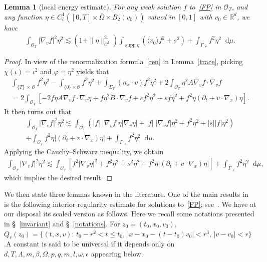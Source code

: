 \documentclass[10pt]{amsart}
\newtheorem{lemm}[theo]{Lemma}\newtheorem{prop}[theo]{Proposition}\newtheorem{coro}[theo]{Corollary}\newtheorem{conj}[theo]{Conjecture}
\theoremstyle{definition}\newtheorem{defi}[theo]{Definition}\newtheorem{rema}[theo]{Remark}\newtheorem{exam}[theo]{Example}\newtheorem{exem}[theo]{Example}\newtheorem{nota}[theo]{Notation}
\newcommand*{\dif}{\mathop{}\!\mathrm{d}}
\DeclareMathOperator{\supp}{supp}
\newcommand*\p{\partial}
\newcommand*\R {\mathbb{R}}
\newcommand*\Ge {\Gamma_{\;\!\!\;\!\!e}}
\newcommand*\OO {\mathcal{O}}
\newcommand{\lvv}{\langle v_0\rangle}
\begin{document}
\begin{lemm}[local energy estimate]\label{energy}
For any weak solution $f$ to~\eqref{FP} in $\OO_T$, and any function $\eta\in C_c^1([0,T]\times\overline{\Omega}\times B_2(v_0))$ valued in $[0,1]$ with $v_0\in\R^d$, we have
\begin{align*}
\int_{\OO_T}\left|\nabla_vf\right|^2\eta^2
\lesssim\left(1+\|\eta\|_{C^1}^2\right)\int_{\supp\eta}\left(\lvv f^2 +s^2\right) +\int_{\Ge} f^2\eta^2 \dif\mu.
\end{align*}
\end{lemm}
\begin{proof}
In view of the renormalization formula~\eqref{ren} in Lemma~\ref{trace}, picking $\chi(\iota)=\iota^2$ and $\varphi=\eta^2$ yields that
\begin{multline*}
\int_{\{T\}\,\times\,\OO}f^2\eta^2-\int_{\{0\}\times\OO}f^2\eta^2 +\int_{\Sigma_T} (n_x\cdot v) f^2\eta^2 +2\int_{\OO_T} \eta^2 A\nabla_vf\cdot\nabla_vf\\
=2\int_{\OO_T}\left[-2f\eta A\nabla_vf\cdot\nabla_v\eta +f\eta^2B\cdot\nabla_vf +cf^2\eta^2 +sf\eta^2 +f^2\eta(\p_t+v\cdot\nabla_x)\eta\right].
\end{multline*}
It then turns out that
\begin{multline*}
\int_{\OO_T} \left|\nabla_vf\right|^2\eta^2
\lesssim
\int_{\OO_T}\left(|f|\;\left|\nabla_vf\right| \eta\left|\nabla_v\eta\right| + |f|\;\left|\nabla_vf\right|\eta^2 +f^2\eta^2 +|s||f|\eta^2\right)\\
+\int_{\OO_T}f^2\eta\left|\left(\p_t+v\cdot\nabla_x\right)\eta\right| +\int_{\Ge}f^2\eta^2\dif\mu.
\end{multline*}
Applying the Cauchy--Schwarz inequality, we obtain
\begin{align*}
\int_{\OO_T} \left|\nabla_vf\right|^2\eta^2
\lesssim
\int_{\OO_T}\left[f^2\left|\nabla_v\eta\right|^2 + f^2\eta^2 + s^2 \eta^2 +f^2\eta\left|\left(\p_t+v\cdot\nabla_x\right)\eta\right|\right] +\int_{\Ge}f^2\eta^2\dif\mu,
\end{align*}
which implies the desired result.
\end{proof}

We then state three lemmas known in the literature. One of the main results in~\cite{GIMV} is the following interior regularity estimate for solutions to~\eqref{FP}; see~\cite[Theorem~1.4]{GIMV}. We have at our disposal its scaled version as follows. Here we recall some notations presented in \S~\ref{invariant} and \S~\ref{notations}. For $z_0=(t_0,x_0,v_0)$, $Q_r(z_{0})=\{ (t,x,v): \, t_{0} - r^{2} < t \le t_{0}, \, |x - x_{0} - (t - t_{0})v_{0}| < r^{3},\, |v - v_{0}| < r\}$.\linebreak A constant is said to be universal if it depends only on $d,T,\Lambda,m,\beta,\Omega,p,q,m,l,\omega,\epsilon$ appearing below.
\end{document}
